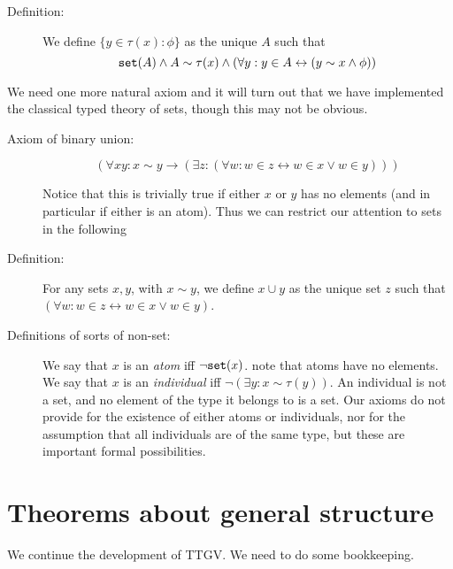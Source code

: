 \documentclass[12pt]{article}
\begin{document}
\begin{description}
\item[Definition:]  We define $\{y \in \tau(x):\phi\}$ as the unique $A$ such that $${\tt set}(A) \wedge A \sim \tau(x) \wedge (\forall y:y \in A \leftrightarrow (y \sim x \wedge \phi))$$

\end{description}


We need one more natural axiom and it will turn out that we have implemented the classical typed theory of sets, though this may not be obvious.

\begin{description}

\item[Axiom of binary union:]  $$(\forall xy: x \sim y \rightarrow (\exists z:(\forall w:w \in z \leftrightarrow w \in x \vee w \in y)))$$

Notice that this is trivially true if either $x$ or $y$ has no elements (and in particular if either is an atom).  Thus we can restrict our attention to sets in the following


\item[Definition:]  For any sets $x,y$, with $x \sim y$, we define $x \cup y$ as the unique set $z$ such that $(\forall w:w \in z \leftrightarrow w \in x \vee w \in y)$.  
\item[Definitions of sorts of non-set:]  We say that $x$ is an {\em atom\/} iff $\neg {\tt set}(x)$.  note that atoms have no elements.  We say that $x$ is an {\em individual\/} iff $\neg(\exists y:x \sim \tau(y))$.  An individual is not a set, and no element of the type it belongs to is a set.  Our axioms do not provide for the existence of either atoms or individuals, nor for the assumption that all individuals are of the same type,  but these are important formal possibilities.



\end{description}


\section{Theorems about general structure}

We continue the development of TTGV.  We need to do some bookkeeping.
\end{document}
